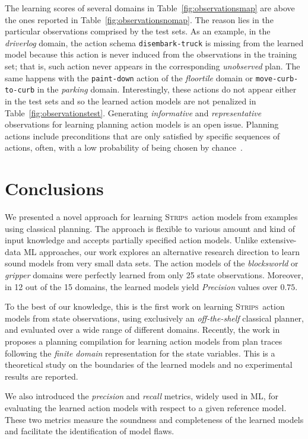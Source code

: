 \documentclass[3p,times]{elsarticle}
\newcommand{\strips}{\textsc{Strips}}     %
\begin{document}
The learning scores of several domains in Table~\ref{fig:observationsmap} are above the ones reported in Table~\ref{fig:observationsnomap}. The reason lies in the particular observations comprised by the test sets. As an example, in the {\em driverlog} domain, the action schema {\small \tt disembark-truck} is missing from the learned model because this action is never induced from the observations in the training set; that is, such action never appears in the corresponding \emph{unobserved} plan. The same happens with the {\small \tt paint-down} action of the {\em floortile} domain or {\small \tt move-curb-to-curb} in the {\em parking} domain. Interestingly, these actions do not appear either in the test sets and so the learned action models are not penalized in Table~\ref{fig:observationstest}. Generating {\em informative} and {\em representative} observations for learning planning action models is an open issue. Planning actions include preconditions that are only satisfied by specific sequences of actions, often, with a low probability of being chosen by chance~\cite{fern2004learning}.


\section{Conclusions}
\label{sec:Section9}
We presented a novel approach for learning \strips\ action models from examples using classical planning. The approach is flexible to various amount and kind of input knowledge and accepts partially specified action models. Unlike extensive-data ML approaches, our work explores an alternative research direction to learn sound models from very small data sets. The action models of the {\em blocksworld} or {\em gripper} domains were perfectly learned from only 25 state observations. Moreover, in 12 out of the 15 domains, the learned models yield {\em Precision} values over $0.75$.

To the best of our knowledge, this is the first work on learning \strips\ action models from state observations, using exclusively an {\em off-the-shelf} classical planner, and evaluated over a wide range of different domains. Recently, the work in~\cite{SternJ17} proposes a planning compilation for learning action models from plan traces following the {\em finite domain} representation for the state variables. This is a theoretical study on the boundaries of the learned models and no experimental results are reported.

We also introduced the {\em precision} and {\em recall} metrics, widely used in ML, for evaluating the learned action models with respect to a given reference model. These two metrics measure the soundness and completeness of the learned models and facilitate the identification of model flaws.
\end{document}
